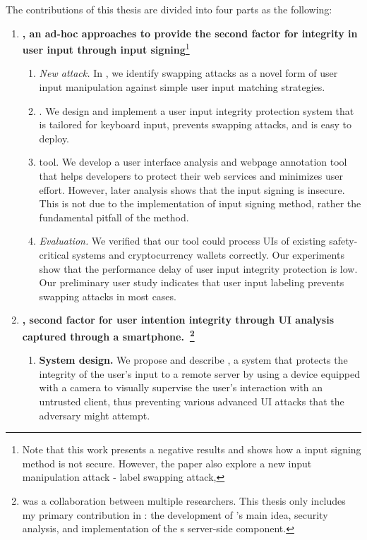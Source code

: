 The contributions of this thesis are divided into four parts as the following:

\begin{enumerate}
  \item \textbf{\integrikey, an ad-hoc approaches to provide the second factor for integrity in user input through input signing}\footnote{Note that this work presents a negative results and shows how a input signing method is not secure. However, the paper also explore a new input manipulation attack - label swapping attack,}

\begin{enumerate}
    \item \emph{New attack.} In \integrikey, we identify swapping attacks as a novel form of user input manipulation against simple user input matching strategies.
    \item \integrikey. We design and implement a user input integrity protection system that is tailored for keyboard input, prevents swapping attacks, and is easy to deploy.
    \item \integrikey{} tool. We develop a user interface analysis and webpage annotation tool that helps developers to protect their web services and minimizes user effort. However, later analysis shows that the input signing is insecure. This is not due to the implementation of input signing method, rather the fundamental pitfall of the method.
    \item \emph{Evaluation.} We verified that our tool could process UIs of existing safety-critical systems and cryptocurrency wallets correctly. Our experiments show that the performance delay of \integrikey user input integrity protection is low. Our preliminary user study indicates that user input labeling prevents swapping attacks in most cases.
\end{enumerate}

	\item \textbf{\integriscreen, second factor for user intention integrity through UI analysis captured through a smartphone.~\footnote{\integriscreen was a collaboration between multiple researchers. This thesis only includes my primary contribution in \integriscreen: the development of \integriscreen{}'s main idea, security analysis, and implementation of the \integriscreen{}s server-side component.}}

\begin{enumerate}
	\item \textbf{System design.}
	We propose and describe \integriscreen, a system that protects the integrity of the user's input to a remote server by using a device equipped with a camera to visually supervise the user's interaction with an untrusted client, thus preventing various advanced UI attacks that the adversary might attempt.


\end{enumerate}
\end{enumerate}
